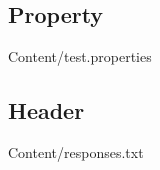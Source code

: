 		\subsection{Property}
			
	                 	{Content/test.properties}
		\subsection{Header}
			
	                 	{Content/responses.txt}
